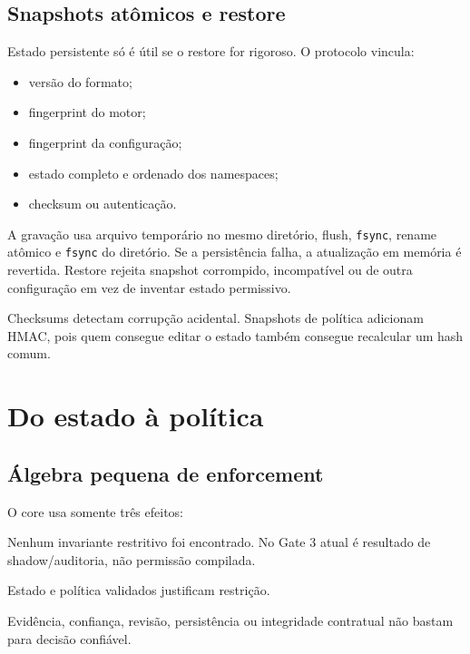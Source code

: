 \documentclass[11pt,a4paper]{article}
\begin{document}
\subsection{Snapshots atômicos e restore}

Estado persistente só é útil se o restore for rigoroso. O protocolo vincula:

\begin{itemize}[leftmargin=*]
  \item versão do formato;
  \item fingerprint do motor;
  \item fingerprint da configuração;
  \item estado completo e ordenado dos namespaces;
  \item checksum ou autenticação.
\end{itemize}

A gravação usa arquivo temporário no mesmo diretório, flush, \texttt{fsync},
rename atômico e \texttt{fsync} do diretório. Se a persistência falha, a
atualização em memória é revertida. Restore rejeita snapshot corrompido,
incompatível ou de outra configuração em vez de inventar estado permissivo.

Checksums detectam corrupção acidental. Snapshots de política adicionam HMAC,
pois quem consegue editar o estado também consegue recalcular um hash comum.

\section{Do estado à política}

\subsection{Álgebra pequena de enforcement}

O core usa somente três efeitos:

\begin{description}[leftmargin=2.4cm,style=nextline]
  \item[\texttt{ALLOW}] Nenhum invariante restritivo foi encontrado. No Gate 3
        atual é resultado de shadow/auditoria, não permissão compilada.
  \item[\texttt{DENY}] Estado e política validados justificam restrição.
  \item[\texttt{ABSTAIN}] Evidência, confiança, revisão, persistência ou
        integridade contratual não bastam para decisão confiável.
\end{description}
\end{document}
